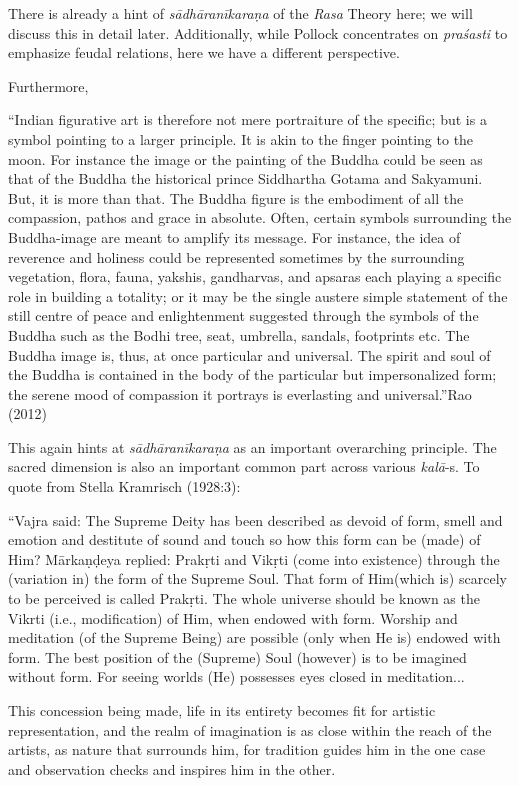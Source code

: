 There is already a hint of \textsl{sādhāranīkaraṇa} of the \textsl{Rasa} Theory here; we will discuss this in detail later. Additionally, while Pollock concentrates on \textsl{praśasti} to emphasize feudal relations, here we have a different perspective. 

Furthermore, 

\begin{myquote}
“Indian figurative art is therefore not mere portraiture of the specific; but is a symbol pointing to a larger principle. It is akin to the finger pointing to the moon. For instance the image or the painting of the Buddha could be seen as that of the Buddha the historical prince Siddhartha Gotama and Sakyamuni. But, it is more than that. The Buddha figure is the embodiment of all the compassion, pathos and grace in absolute. Often, certain symbols surrounding the Buddha-image are meant to amplify its message. For instance, the idea of reverence and holiness could be represented sometimes by the surrounding vegetation, flora, fauna, yakshis, gandharvas, and apsaras each playing a specific role in building a totality; or it may be the single austere simple statement of the still centre of peace and enlightenment suggested through the symbols of the Buddha such as the Bodhi tree, seat, umbrella, sandals, footprints etc. The Buddha image is, thus, at once particular and universal. The spirit and soul of the Buddha is contained in the body of the particular but impersonalized form; the serene mood of compassion it portrays is everlasting and universal.”\hfill Rao (2012)
\end{myquote}

This again hints at \textsl{sādhāranīkaraṇa} as an important overarching principle. The sacred dimension is also an important common part across various \textsl{kalā}-s. To quote from Stella Kramrisch (1928:3):

\begin{myquote}
“Vajra said: The Supreme Deity has been described as devoid of form, smell and emotion and destitute of sound and touch so how this form can be (made) of Him? Mārkaṇḍeya replied: Prakṛti and Vikṛti (come into existence) through the (variation in) the form of the Supreme Soul. That form of Him(which is) scarcely to be perceived is called Prakṛti. The whole universe should be known as the Vikrti (i.e., modification) of Him, when endowed with form. Worship and meditation (of the Supreme Being) are possible (only when He is) endowed with form. The best position of the (Supreme) Soul (however) is to be imagined without form. For seeing worlds (He) possesses eyes closed in meditation... 

This concession being made, life in its entirety becomes fit for artistic representation, and the realm of imagination is as close within the reach of the artists, as nature that surrounds him, for tradition guides him in the one case and observation checks and inspires him in the other. 
\end{myquote}

